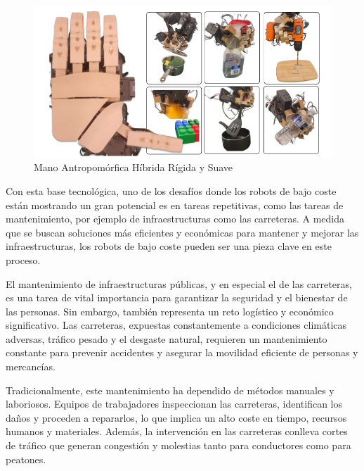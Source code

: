 \begin{figure} [h!]
	\begin{center}
		\includegraphics[width=16cm]{figs/handlowcost.png}
	\end{center}
	\caption{Mano Antropomórfica Híbrida Rígida y Suave} %
	\label{fig:roblowcost}
\end{figure}


Con esta base tecnológica, uno de los desafíos donde los robots de bajo coste están mostrando un gran potencial es en tareas repetitivas, como las tareas de mantenimiento, por ejemplo de infraestructuras como las carreteras. A medida que se buscan soluciones más eficientes y económicas para mantener y mejorar las infraestructuras, los robots de bajo coste pueden ser una pieza clave en este proceso.

El mantenimiento de infraestructuras públicas, y en especial el de las carreteras, es una tarea de vital importancia para garantizar la seguridad y el bienestar de las personas. Sin embargo, también representa un reto logístico y económico significativo. Las carreteras, expuestas constantemente a condiciones climáticas adversas, tráfico pesado y el desgaste natural, requieren un mantenimiento constante para prevenir accidentes y asegurar la movilidad eficiente de personas y mercancías.

Tradicionalmente, este mantenimiento ha dependido de métodos manuales y laboriosos. Equipos de trabajadores inspeccionan las carreteras, identifican los daños y proceden a repararlos, lo que implica un alto coste en tiempo, recursos humanos y materiales. Además, la intervención en las carreteras conlleva cortes de tráfico que generan congestión y molestias tanto para conductores como para peatones.

